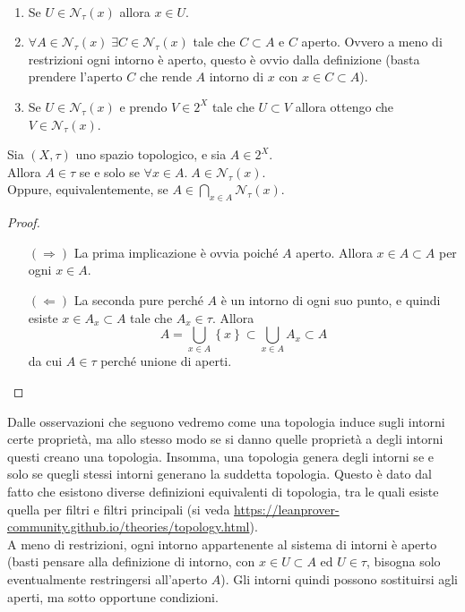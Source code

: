 \begin{remark} \
	\label{rmk:intorni_top}
	\begin{enumerate}
		\item Se $U \in \mathcal{N}_\tau(x)$ allora $x \in U$.
		\item $\forall A \in \mathcal{N}_\tau(x) \; \exists C \in \mathcal{N}_\tau(x)$ tale che $C \subset A$ e $C$ aperto. Ovvero a meno di restrizioni ogni intorno è aperto, questo è ovvio dalla definizione (basta prendere l'aperto $C$ che rende $A$ intorno di $x$ con $x\in C \subset A$).
		\item Se $U \in \mathcal{N}_\tau(x)$ e prendo $V \in 2^X$ tale che $U \subset V$ allora ottengo che $V \in \mathcal{N}_\tau(x)$. 
	\end{enumerate}	
\end{remark}

\begin{proposition}
	Sia $(X,\tau)$ uno spazio topologico, e sia $A \in 2^X$. \\ Allora $A \in \tau$ se e solo se $\forall x \in A . \; A \in \mathcal{N}_\tau(x)$. \\ Oppure,  equivalentemente, se $A \in \bigcap_{x \in A} \mathcal{N}_\tau(x)$.
\end{proposition}
\begin{proof} \
	\begin{enumerate}
		\item[$(\Rightarrow)$] La prima implicazione è ovvia poiché $A$ aperto. Allora $x \in A \subset A$ per ogni $x \in A$.
		\item[$(\Leftarrow)$]	La seconda pure perché $A$ è un intorno di ogni suo punto, e quindi esiste $x \in A_x \subset A$ tale che $A_x \in \tau$. Allora
		\begin{equation*}
			A = \bigcup_{x \in A} \left\{x\right\} \subset \bigcup_{x\in A} A_x \subset A
		\end{equation*}
		da cui $A \in \tau$ perché unione di aperti. 
	\end{enumerate}
\end{proof}

Dalle osservazioni che seguono vedremo come una topologia induce sugli intorni certe proprietà, ma allo stesso modo se si danno quelle proprietà a degli intorni questi creano una topologia. Insomma, una topologia genera degli intorni se e solo se quegli stessi intorni generano la suddetta topologia. Questo è dato dal fatto che esistono diverse definizioni equivalenti di topologia, tra le quali esiste quella per filtri e filtri principali (si veda \url{https://leanprover-community.github.io/theories/topology.html}). \\
A meno di restrizioni, ogni intorno appartenente al sistema di intorni è aperto (basti pensare alla definizione di intorno, con $x \in U \subset A$ ed $U \in \tau$, bisogna solo eventualmente restringersi all'aperto $A$). Gli intorni quindi possono sostituirsi agli aperti, ma sotto opportune condizioni.

